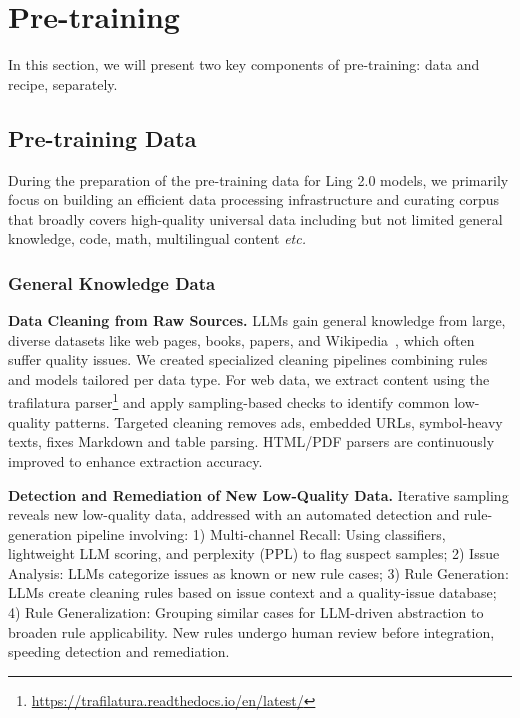 \section{Pre-training}\label{sec:pretrain}

In this section, we will present two key components of pre-training: data and recipe, separately.

\subsection{Pre-training Data}
During the preparation of the pre-training data for Ling 2.0 models, we primarily focus on building an efficient data processing infrastructure and curating corpus that broadly covers high-quality universal data including but not limited general knowledge, code, math, multilingual content \emph{etc.}

\subsubsection{General Knowledge Data}

{\bfseries Data Cleaning from Raw Sources.}
LLMs gain general knowledge from large, diverse datasets like web pages, books, papers, and Wikipedia~\citep{soldaini2024dolmaopencorpustrillion}, which often suffer quality issues. We created specialized cleaning pipelines combining rules and models tailored per data type. For web data, we extract content using the trafilatura parser\footnote{\url{https://trafilatura.readthedocs.io/en/latest/}} and apply sampling-based checks to identify common low-quality patterns. Targeted cleaning removes ads, embedded URLs, symbol-heavy texts, fixes Markdown and table parsing. HTML/PDF parsers are continuously improved to enhance extraction accuracy.

{\bfseries Detection and Remediation of New Low-Quality Data.} 
Iterative sampling reveals new low-quality data, addressed with an automated detection and rule-generation pipeline involving: 1) Multi-channel Recall: Using classifiers, lightweight LLM scoring, and perplexity (PPL) to flag suspect samples; 2) Issue Analysis: LLMs categorize issues as known or new rule cases; 3) Rule Generation: LLMs create cleaning rules based on issue context and a quality-issue database; 4) Rule Generalization: Grouping similar cases for LLM-driven abstraction to broaden rule applicability. New rules undergo human review before integration, speeding detection and remediation.

